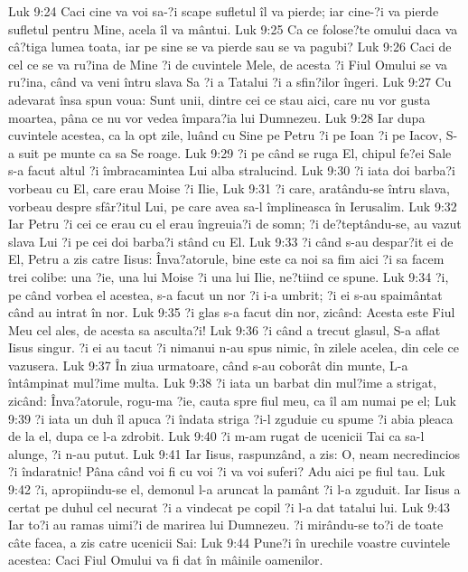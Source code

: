 Luk 9:24  Caci cine va voi sa-?i scape sufletul îl va pierde; iar cine-?i va pierde sufletul pentru Mine, acela îl va mântui.
Luk 9:25  Ca ce folose?te omului daca va câ?tiga lumea toata, iar pe sine se va pierde sau se va pagubi?
Luk 9:26  Caci de cel ce se va ru?ina de Mine ?i de cuvintele Mele, de acesta ?i Fiul Omului se va ru?ina, când va veni întru slava Sa ?i a Tatalui ?i a sfin?ilor îngeri.
Luk 9:27  Cu adevarat însa spun voua: Sunt unii, dintre cei ce stau aici, care nu vor gusta moartea, pâna ce nu vor vedea împara?ia lui Dumnezeu.
Luk 9:28  Iar dupa cuvintele acestea, ca la opt zile, luând cu Sine pe Petru ?i pe Ioan ?i pe Iacov, S-a suit pe munte ca sa Se roage.
Luk 9:29  ?i pe când se ruga El, chipul fe?ei Sale s-a facut altul ?i îmbracamintea Lui alba stralucind.
Luk 9:30  ?i iata doi barba?i vorbeau cu El, care erau Moise ?i Ilie,
Luk 9:31  ?i care, aratându-se întru slava, vorbeau despre sfâr?itul Lui, pe care avea sa-l împlineasca în Ierusalim.
Luk 9:32  Iar Petru ?i cei ce erau cu el erau îngreuia?i de somn; ?i de?teptându-se, au vazut slava Lui ?i pe cei doi barba?i stând cu El.
Luk 9:33  ?i când s-au despar?it ei de El, Petru a zis catre Iisus: Înva?atorule, bine este ca noi sa fim aici ?i sa facem trei colibe: una ?ie, una lui Moise ?i una lui Ilie, ne?tiind ce spune.
Luk 9:34  ?i, pe când vorbea el acestea, s-a facut un nor ?i i-a umbrit; ?i ei s-au spaimântat când au intrat în nor.
Luk 9:35  ?i glas s-a facut din nor, zicând: Acesta este Fiul Meu cel ales, de acesta sa asculta?i!
Luk 9:36  ?i când a trecut glasul, S-a aflat Iisus singur. ?i ei au tacut ?i nimanui n-au spus nimic, în zilele acelea, din cele ce vazusera.
Luk 9:37  În ziua urmatoare, când s-au coborât din munte, L-a întâmpinat mul?ime multa.
Luk 9:38  ?i iata un barbat din mul?ime a strigat, zicând: Înva?atorule, rogu-ma ?ie, cauta spre fiul meu, ca îl am numai pe el;
Luk 9:39  ?i iata un duh îl apuca ?i îndata striga ?i-l zguduie cu spume ?i abia pleaca de la el, dupa ce l-a zdrobit.
Luk 9:40  ?i m-am rugat de ucenicii Tai ca sa-l alunge, ?i n-au putut.
Luk 9:41  Iar Iisus, raspunzând, a zis: O, neam necredincios ?i îndaratnic! Pâna când voi fi cu voi ?i va voi suferi? Adu aici pe fiul tau.
Luk 9:42  ?i, apropiindu-se el, demonul l-a aruncat la pamânt ?i l-a zguduit. Iar Iisus a certat pe duhul cel necurat ?i a vindecat pe copil ?i l-a dat tatalui lui.
Luk 9:43  Iar to?i au ramas uimi?i de marirea lui Dumnezeu. ?i mirându-se to?i de toate câte facea, a zis catre ucenicii Sai:
Luk 9:44  Pune?i în urechile voastre cuvintele acestea: Caci Fiul Omului va fi dat în mâinile oamenilor.
